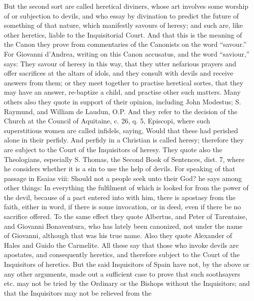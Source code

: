              But the second sort are called heretical diviners, whose art involves some worship of or
       subjection to devils, and who essay by divination to predict the future of something of that
       nature, which manifestly savours of heresy; and such are, like other heretics, liable to the
       Inquisitorial Court.
             And that this is the meaning of the Canon they prove from commentaries of the
       Canonists on the word “savour.” For Giovanni d’Andrea, writing on this Canon accusatus,
       and the word “saviour,” says: They savour of heresy in this way, that they utter nefarious
       prayers and offer sacrifices at the altars of idols, and they consult with devils and receive
       answers from them; or they meet together to practise heretical sortes, that they may have an
       answer, re-baptize a child, and practise other such matters.
             Many others also they quote in support of their opinion, including John Modestus; S.
       Raymund, and William de Laudun, O.P. And they refer to the decision of the Church at the
       Council of Aquitaine, c. 26, q. 5, Episcopi, where such superstitious women are called
       infidels, saying, Would that these had perished alone in their perfidy. And perfidy in a
       Christian is called heresy; therefore they are subject to the Court of the Inquisitors of heresy.
             They quote also the Theologians, especially S. Thomas, the Second Book of Sentences,
       dist. 7, where he considers whether it is a sin to use the help of devils. For speaking of that
       passage in Esaias viii: Should not a people seek unto their God? he says among other things:
       In everything the fulfilment of which is looked for from the power of the devil, because of a
       pact entered into with him, there is apostasy from the faith, either in word, if there is some
       invocation, or in deed, even if there be no sacrifice offered.
             To the same effect they quote Albertus, and Peter of Tarentaise, and Giovanni
       Bonaventura, who has lately been canonized, not under the name of Giovanni, although that
       was his true name. Also they quote Alexander of Hales and Guido the Carmelite. All these
       say that those who invoke devils are apostates, and consequently heretics, and therefore
       subject to the Court of the Inquisitors of heretics.
             But the said Inquisitors of Spain have not, by the above or any other arguments, made
       out a sufficient case to prove that such soothsayers etc. may not be tried by the Ordinary or
       the Bishops without the Inquisitors; and that the Inquisitors may not be relieved from the
